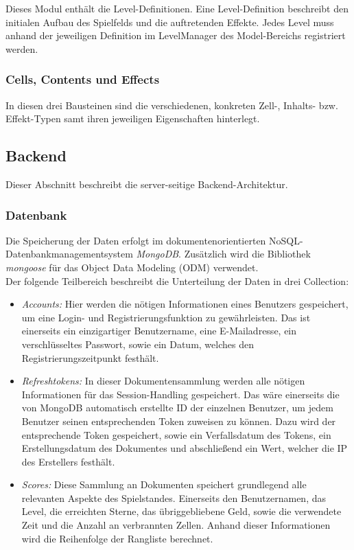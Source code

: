 \documentclass[letterpaper, 10 pt, conference]{ieeeconf}
\begin{document}
Dieses Modul enthält die Level-Definitionen.
Eine Level-Definition beschreibt den initialen Aufbau des Spielfelds und die auftretenden Effekte.
Jedes Level muss anhand der jeweiligen Definition im LevelManager des Model-Bereichs registriert werden.

\subsubsection{Cells, Contents und Effects}

In diesen drei Bausteinen sind die verschiedenen, konkreten Zell-, Inhalts- bzw. Effekt-Typen samt ihren jeweiligen Eigenschaften hinterlegt.

\subsection{Backend}
Dieser Abschnitt beschreibt die server-seitige Backend-Architektur.

\subsubsection{Datenbank}

Die Speicherung der Daten erfolgt im dokumentenorientierten NoSQL-Datenbankmanagementsystem \textit{MongoDB}.
Zusätzlich wird die Bibliothek  \textit{mongoose} für das Object Data Modeling (ODM) verwendet. \\
Der folgende Teilbereich beschreibt die Unterteilung der Daten in drei Collection:

\begin{itemize}
\item
\textit{Accounts:} Hier werden die nötigen Informationen eines Benutzers gespeichert, um
eine Login- und Registrierungsfunktion zu gewährleisten. Das ist einerseits ein
einzigartiger Benutzername, eine E-Mailadresse, ein verschlüsseltes Passwort, sowie
ein Datum, welches den Registrierungszeitpunkt festhält.
\item
\textit{Refreshtokens:} In dieser Dokumentensammlung werden alle nötigen Informationen für
das Session-Handling gespeichert. Das wäre einerseits die von MongoDB automatisch
erstellte ID der einzelnen Benutzer, um jedem Benutzer seinen entsprechenden Token
zuweisen zu können. Dazu wird der entsprechende Token gespeichert, sowie ein Verfallsdatum
des Tokens, ein Erstellungsdatum des Dokumentes und abschließend ein Wert, welcher die
IP des Erstellers festhält.
\item
\textit{Scores:} Diese Sammlung an Dokumenten speichert grundlegend alle relevanten Aspekte des
Spielstandes. Einerseits den Benutzernamen, das Level, die erreichten Sterne, das
übriggebliebene Geld, sowie die verwendete Zeit und die Anzahl an verbrannten Zellen.
Anhand dieser Informationen wird die Reihenfolge der Rangliste berechnet.
\end{itemize}
\end{document}

